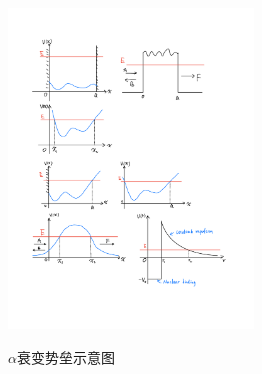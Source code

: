 \documentclass[a4paper,zihao=-4,linespread=1]{ctexrep}
\begin{document}
    \begin{figure}[h]
        \centering
        \includegraphics[width=6.5cm]{fig/9-x.pdf}
        \label{fig:9.x}
        \caption{$\alpha $衰变势垒示意图}
    \end{figure}
\end{document}
